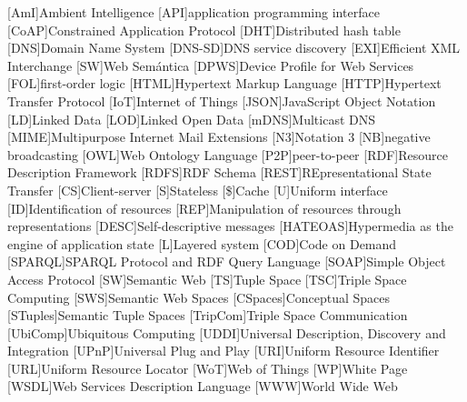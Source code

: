 \begin{acronym}[resthateoas]  
  [AmI]{Ambient Intelligence}
  [API]{application programming interface}
  [CoAP]{Constrained Application Protocol}
  [DHT]{Distributed hash table}
  [DNS]{Domain Name System}
  [DNS-SD]{DNS service discovery}
  [EXI]{Efficient XML Interchange}
  [SW]{Web Semántica}
  [DPWS]{Device Profile for Web Services}
  [FOL]{first-order logic}
  [HTML]{Hypertext Markup Language}
  [HTTP]{Hypertext Transfer Protocol}
  [IoT]{Internet of Things}
  [JSON]{JavaScript Object Notation}
  [LD]{Linked Data} %
  [LOD]{Linked Open Data}
  [mDNS]{Multicast DNS}
  [MIME]{Multipurpose Internet Mail Extensions}
  [N3]{Notation 3}
  [NB]{negative broadcasting}
  [OWL]{Web Ontology Language}
  [P2P]{peer-to-peer}
  [RDF]{Resource Description Framework}
  [RDFS]{RDF Schema}
  [REST]{REpresentational State Transfer} %
    [CS]{Client-server}
    [S]{Stateless}
    [\$]{Cache}
    [U]{Uniform interface}
    [ID]{Identification of resources}
    [REP]{Manipulation of resources through representations}
    [DESC]{Self-descriptive messages}
    [HATEOAS]{Hypermedia as the engine of application state}
    [L]{Layered system}
    [COD]{Code on Demand} %
  [SPARQL]{SPARQL Protocol and RDF Query Language}
  [SOAP]{Simple Object Access Protocol}
  [SW]{Semantic Web}
  [TS]{Tuple Space}
  [TSC]{Triple Space Computing} %
    [SWS]{Semantic Web Spaces}
    [CSpaces]{Conceptual Spaces}
    [STuples]{Semantic Tuple Spaces}
    [TripCom]{Triple Space Communication}
  [UbiComp]{Ubiquitous Computing}
  [UDDI]{Universal Description, Discovery and Integration}
  [UPnP]{Universal Plug and Play}
  [URI]{Uniform Resource Identifier}
  [URL]{Uniform Resource Locator}
  [WoT]{Web of Things}
  [WP]{White Page}
  [WSDL]{Web Services Description Language}
  [WWW]{World Wide Web} %
\end{acronym}

